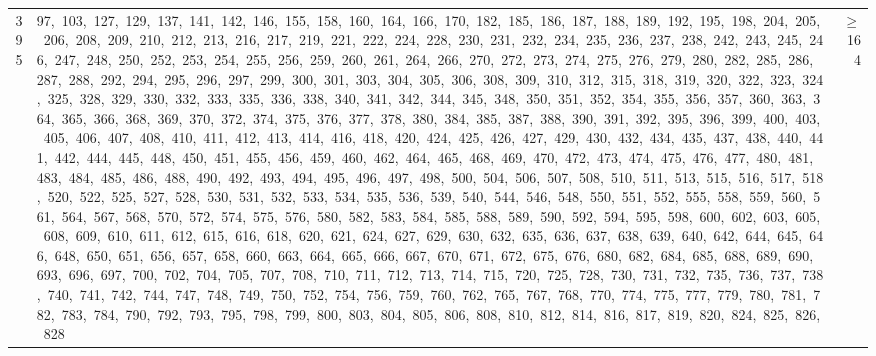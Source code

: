\begin{longtable}{c|p{}|r}
395 & 97,\ 103,\ 127,\ 129,\ 137,\ 141,\ 142,\ 146,\ 155,\ 158,\ 160,\ 164,\ 166,\ 170,\ 182,\ 185,\ 186,\ 187,\ 188,\ 189,\ 192,\ 195,\ 198,\ 204,\ 205,\ 206,\ 208,\ 209,\ 210,\ 212,\ 213,\ 216,\ 217,\ 219,\ 221,\ 222,\ 224,\ 228,\ 230,\ 231,\ 232,\ 234,\ 235,\ 236,\ 237,\ 238,\ 242,\ 243,\ 245,\ 246,\ 247,\ 248,\ 250,\ 252,\ 253,\ 254,\ 255,\ 256,\ 259,\ 260,\ 261,\ 264,\ 266,\ 270,\ 272,\ 273,\ 274,\ 275,\ 276,\ 279,\ 280,\ 282,\ 285,\ 286,\ 287,\ 288,\ 292,\ 294,\ 295,\ 296,\ 297,\ 299,\ 300,\ 301,\ 303,\ 304,\ 305,\ 306,\ 308,\ 309,\ 310,\ 312,\ 315,\ 318,\ 319,\ 320,\ 322,\ 323,\ 324,\ 325,\ 328,\ 329,\ 330,\ 332,\ 333,\ 335,\ 336,\ 338,\ 340,\ 341,\ 342,\ 344,\ 345,\ 348,\ 350,\ 351,\ 352,\ 354,\ 355,\ 356,\ 357,\ 360,\ 363,\ 364,\ 365,\ 366,\ 368,\ 369,\ 370,\ 372,\ 374,\ 375,\ 376,\ 377,\ 378,\ 380,\ 384,\ 385,\ 387,\ 388,\ 390,\ 391,\ 392,\ 395,\ 396,\ 399,\ 400,\ 403,\ 405,\ 406,\ 407,\ 408,\ 410,\ 411,\ 412,\ 413,\ 414,\ 416,\ 418,\ 420,\ 424,\ 425,\ 426,\ 427,\ 429,\ 430,\ 432,\ 434,\ 435,\ 437,\ 438,\ 440,\ 441,\ 442,\ 444,\ 445,\ 448,\ 450,\ 451,\ 455,\ 456,\ 459,\ 460,\ 462,\ 464,\ 465,\ 468,\ 469,\ 470,\ 472,\ 473,\ 474,\ 475,\ 476,\ 477,\ 480,\ 481,\ 483,\ 484,\ 485,\ 486,\ 488,\ 490,\ 492,\ 493,\ 494,\ 495,\ 496,\ 497,\ 498,\ 500,\ 504,\ 506,\ 507,\ 508,\ 510,\ 511,\ 513,\ 515,\ 516,\ 517,\ 518,\ 520,\ 522,\ 525,\ 527,\ 528,\ 530,\ 531,\ 532,\ 533,\ 534,\ 535,\ 536,\ 539,\ 540,\ 544,\ 546,\ 548,\ 550,\ 551,\ 552,\ 555,\ 558,\ 559,\ 560,\ 561,\ 564,\ 567,\ 568,\ 570,\ 572,\ 574,\ 575,\ 576,\ 580,\ 582,\ 583,\ 584,\ 585,\ 588,\ 589,\ 590,\ 592,\ 594,\ 595,\ 598,\ 600,\ 602,\ 603,\ 605,\ 608,\ 609,\ 610,\ 611,\ 612,\ 615,\ 616,\ 618,\ 620,\ 621,\ 624,\ 627,\ 629,\ 630,\ 632,\ 635,\ 636,\ 637,\ 638,\ 639,\ 640,\ 642,\ 644,\ 645,\ 646,\ 648,\ 650,\ 651,\ 656,\ 657,\ 658,\ 660,\ 663,\ 664,\ 665,\ 666,\ 667,\ 670,\ 671,\ 672,\ 675,\ 676,\ 680,\ 682,\ 684,\ 685,\ 688,\ 689,\ 690,\ 693,\ 696,\ 697,\ 700,\ 702,\ 704,\ 705,\ 707,\ 708,\ 710,\ 711,\ 712,\ 713,\ 714,\ 715,\ 720,\ 725,\ 728,\ 730,\ 731,\ 732,\ 735,\ 736,\ 737,\ 738,\ 740,\ 741,\ 742,\ 744,\ 747,\ 748,\ 749,\ 750,\ 752,\ 754,\ 756,\ 759,\ 760,\ 762,\ 765,\ 767,\ 768,\ 770,\ 774,\ 775,\ 777,\ 779,\ 780,\ 781,\ 782,\ 783,\ 784,\ 790,\ 792,\ 793,\ 795,\ 798,\ 799,\ 800,\ 803,\ 804,\ 805,\ 806,\ 808,\ 810,\ 812,\ 814,\ 816,\ 817,\ 819,\ 820,\ 824,\ 825,\ 826,\ 828 & $\ge$ 164 \\

\end{longtable}
